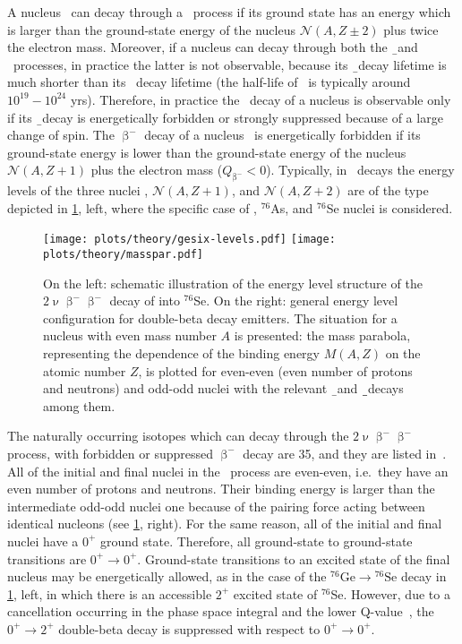 A nucleus \NAZ\ can decay through a \nnbb\ process if its ground state has an
energy which is larger than the ground-state energy of the nucleus
$\mathcal{N}(A,Z\pm2)$ plus twice the electron mass. Moreover, if a nucleus can
decay through both the \b\ and \nnbb\ processes, in practice the latter is not
observable, because its \b\ decay lifetime is much shorter than its \nnbb\
decay lifetime (the half-life of \nnbb\ is typically around $10^{19}-10^{24}$
yrs). Therefore, in practice the \nnbb\ decay of a nucleus is observable only
if its \b\ decay is energetically forbidden or strongly suppressed because of a
large change of spin. The $\upbeta^-$ decay of a nucleus \NAZ\ is energetically
forbidden if its ground-state energy is lower than the ground-state energy of
the nucleus $\mathcal{N}(A,Z+1)$ plus the electron mass ($Q_{\upbeta^{-}} < 0$).
Typically, in \nnbbm\ decays the energy levels of the three nuclei \NAZ,
$\mathcal{N}(A,Z+1)$, and $\mathcal{N}(A,Z+2)$ are of the type depicted in
\cref{fig:nbb:gesixlevels}, left, where the specific case of \gesix,
$^{76}$As, and $^{76}$Se nuclei is considered.

\begin{figure}
  \centering
  \texttt{[image: plots/theory/gesix-levels.pdf]}%
  \texttt{[image: plots/theory/masspar.pdf]}%
  \caption{%
    On the left: schematic illustration of the energy level structure of the
    $2\upnu\upbeta^-\upbeta^-$ decay of \gesix into $^{76}$Se. On the right: general
    energy level configuration for double-beta decay emitters.  The situation
    for a nucleus with even mass number $A$ is presented: the mass parabola,
    representing the dependence of the binding energy $M(A,Z)$ on the atomic
    number $Z$, is plotted for even-even (even number of protons and neutrons)
    and odd-odd nuclei with the relevant \b\ and \b\b\ decays among them.
  }\label{fig:nbb:gesixlevels}
\end{figure}

\partitle{$2\upnu\upbeta^-\upbeta^-$}
The naturally occurring isotopes which can decay through the
$2\upnu\upbeta^-\upbeta^-$ process, with forbidden or suppressed $\upbeta^-$ decay are
35, and they are listed in~\cite{Giunti2007}. All of the initial and final
nuclei in the \nnbbm\ process are even-even, i.e.~they have an
even number of protons and neutrons. Their binding energy is larger than the
intermediate odd-odd nuclei one because of the pairing force acting between
identical nucleons (see \cref{fig:nbb:gesixlevels}, right). For the same reason,
all of the initial and final nuclei have a $0^+$ ground state.  Therefore, all
ground-state to ground-state transitions are $0^+\rightarrow0^+$. Ground-state
transitions to an excited state of the final nucleus may be energetically
allowed, as in the case of the $^{76}\text{Ge} \rightarrow {^{76}\text{Se}}$ decay in
\cref{fig:nbb:gesixlevels}, left, in which there is an accessible $2^+$ excited
state of $^{76}$Se. However, due to a cancellation occurring in the phase
space integral and the lower Q-value~\cite{Tomoda1991}, the
$0^+\rightarrow2^+$ double-beta decay is suppressed with respect to
$0^+\rightarrow0^+$.

